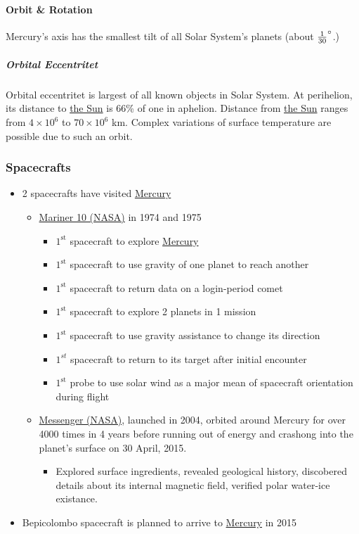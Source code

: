 \paragraph{Orbit \& Rotation}

Mercury's axis has the smallest tilt of all Solar System's planets (about
$\frac{1}{30}\degree$.)
\subparagraph{Orbital Eccentritet}
Orbital eccentritet is largest of all known objects in Solar System. At
perihelion, its distance to \hyperref[star:sun]{the Sun} is 66\% of one in
aphelion. Distance from \hyperref[star:sun]{the Sun} ranges from $4\times 10^6$
to $70\times 10^6$ km. Complex variations of surface temperature are possible
due to such an orbit.
\subsubsection{Spacecrafts}
\label{planet:mercury:spacecraft}
\begin{itemize}
	\item 2 spacecrafts have visited \hyperref[planet:mercury]{Mercury}
		\begin{itemize}
			\item \href{https://solarsystem.nasa.gov/missions/mariner-10/in-depth/}{Mariner 10
				(NASA)} in 1974 and 1975
				\label{planet:mercury:spacecraft:mariner10}
				\begin{itemize}
					\item $1^{\text{st}}$ spacecraft to
						explore
						\hyperref[planet:mercury]{Mercury}
					\item $1^{\text{st}}$ spacecraft to use
						gravity of one planet to reach
						another
					\item $1^{\text{st}}$ spacecraft to
						return data on a login-period
						comet
					\item $1^{\text{st}}$ spacecraft to
						explore 2 planets in 1 mission
					\item $1^{\text{st}}$ spacecraft to use
						gravity assistance to change its
						direction
					\item $1^{st}$ spacecraft to return to
						its target after initial
						encounter
					\item $1^{\text{st}}$ probe to use solar
						wind as a major mean of
						spacecraft orientation during
						flight
				\end{itemize}
			\item
				\href{https://solarsystem.nasa.gov/missions/messenger/in-depth/}{Messenger
				(NASA)}, launched in 2004, orbited around
				Mercury for over 4000 times in 4 years before
				running out of energy and crashong into the
				planet's surface on 30 April, 2015.
				\begin{itemize}
					\item Explored surface ingredients,
						revealed geological history,
						discobered details about its
						internal magnetic field,
						verified polar water-ice
						existance.
				\end{itemize}

		\end{itemize}
	\item Bepicolombo spacecraft is planned to arrive to
		\hyperref[planet:mercury]{Mercury} in 2015
\end{itemize}
